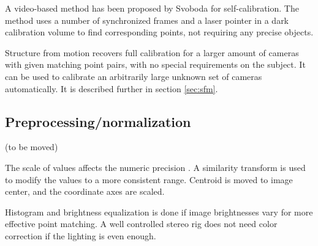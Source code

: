 A video-based method has been proposed by Svoboda for self-calibration.
The method uses a number of synchronized frames and a laser pointer in a dark calibration volume to find corresponding points, not requiring any precise objects. \cite{svoboda2005convenient}

Structure from motion recovers full calibration for a larger amount of cameras with given matching point pairs, with no special requirements on the subject.
It can be used to calibrate an arbitrarily large unknown set of cameras automatically.
It is described further in section \ref{sec:sfm}.






\subsection{Preprocessing/normalization} %

(to be moved)

The scale of values affects the numeric precision \cite{hartley1997defense,hartley03multiview}.
A similarity transform is used to modify the values to a more consistent range.
Centroid is moved to image center, and the coordinate axes are scaled.


Histogram and brightness equalization is done if image brightnesses vary for more effective point matching.
A well controlled stereo rig does not need color correction if the lighting is even enough.


